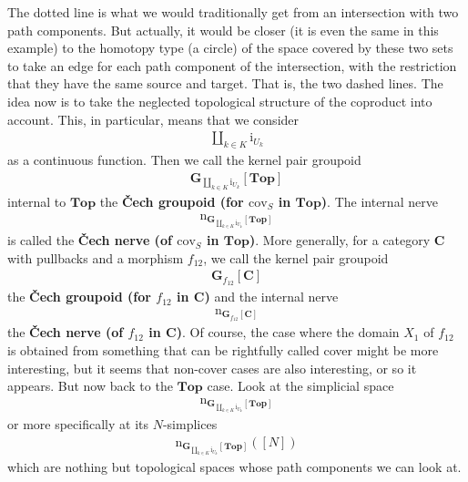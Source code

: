 The dotted line is what we would traditionally get from an intersection with two path components.
But actually, it would be closer (it is even the same in this example) to the homotopy type (a circle) of the space covered by these two sets to take an edge for each path component of the intersection, with the restriction that they have the same source and target.
That is, the two dashed lines.
The idea now is to take the neglected topological structure of the coproduct into account.
This, in particular, means that we consider
\begin{align*}
  \coprod_{k \in K}
  \mathrm{i}_{U_{k}}
\end{align*}
as a continuous function.
Then we call the kernel pair groupoid
\begin{align*}
  \mathbf{G}_{\coprod_{k \in K}\mathrm{i}_{U_{k}}}[\mathbf{Top}]
\end{align*}
internal to $\mathbf{Top}$ the \textbf{\v{C}ech groupoid (for $\mathrm{cov}_{S}$ in $\mathbf{Top}$)}.
The internal nerve
\begin{align*}
  \mathrm{n}_{\mathbf{G}_{\coprod_{k \in K}\mathrm{i}_{U_{k}}}[\mathbf{Top}]}
\end{align*}
is called the \textbf{\v{C}ech nerve (of $\mathrm{cov}_{S}$ in $\mathbf{Top}$)}.
More generally, for a category $\mathbf{C}$ with pullbacks and a morphism $f_{12}$, we call the kernel pair groupoid
\begin{align*}
  \mathbf{G}_{f_{12}}[\mathbf{C}]
\end{align*}
the \textbf{\v{C}ech groupoid (for $f_{12}$ in $\mathbf{C}$)} and the internal nerve
\begin{align*}
  \mathrm{n}_{\mathbf{G}_{f_{12}}[\mathbf{C}]}
\end{align*}
the \textbf{\v{C}ech nerve (of $f_{12}$ in $\mathbf{C}$)}.
Of course, the case where the domain $X_{1}$ of $f_{12}$ is obtained from something that can be rightfully called {\glqq}cover{\grqq} might be more interesting, but it seems that non-cover cases are also interesting, or so it appears.
But now back to the $\mathbf{Top}$ case.
Look at the simplicial space
\begin{align*}
  \mathrm{n}_{\mathbf{G}_{\coprod_{k \in K}\mathrm{i}_{U_{k}}}[\mathbf{Top}]}
\end{align*}
or more specifically at its $N$-simplices
\begin{align*}
  \mathrm{n}_{\mathbf{G}_{\coprod_{k \in K}\mathrm{i}_{U_{k}}}[\mathbf{Top}]}
  ([N])
\end{align*}
which are nothing but topological spaces whose path components we can look at.
